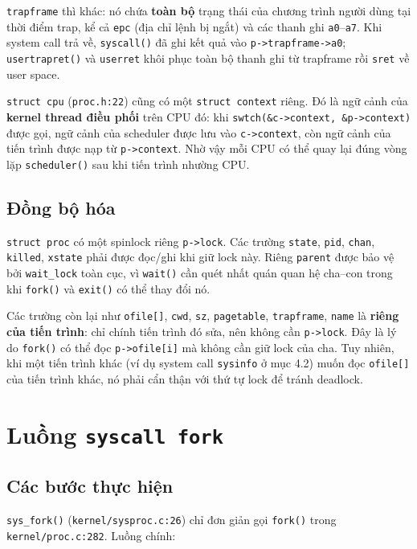 \texttt{trapframe} thì khác: nó chứa \textbf{toàn bộ} trạng thái của chương trình người dùng tại thời điểm trap, kể cả \texttt{epc} (địa chỉ lệnh bị ngắt) và các thanh ghi \texttt{a0}–\texttt{a7}. Khi system call trả về, \texttt{syscall()} đã ghi kết quả vào \texttt{p->trapframe->a0}; \texttt{usertrapret()} và \texttt{userret} khôi phục toàn bộ thanh ghi từ trapframe rồi \texttt{sret} về user space.

\texttt{struct cpu} (\texttt{proc.h:22}) cũng có một \texttt{struct context} riêng. Đó là ngữ cảnh của \textbf{kernel thread điều phối} trên CPU đó: khi \texttt{swtch(\&c->context, \&p->context)} được gọi, ngữ cảnh của scheduler được lưu vào \texttt{c->context}, còn ngữ cảnh của tiến trình được nạp từ \texttt{p->context}. Nhờ vậy mỗi CPU có thể quay lại đúng vòng lặp \texttt{scheduler()} sau khi tiến trình nhường CPU.

\subsection{Đồng bộ hóa}

\texttt{struct proc} có một spinlock riêng \texttt{p->lock}. Các trường \texttt{state}, \texttt{pid}, \texttt{chan}, \texttt{killed}, \texttt{xstate} phải được đọc/ghi khi giữ lock này. Riêng \texttt{parent} được bảo vệ bởi \texttt{wait\_lock} toàn cục, vì \texttt{wait()} cần quét nhất quán quan hệ cha–con trong khi \texttt{fork()} và \texttt{exit()} có thể thay đổi nó.

Các trường còn lại như \texttt{ofile[]}, \texttt{cwd}, \texttt{sz}, \texttt{pagetable}, \texttt{trapframe}, \texttt{name} là \textbf{riêng của tiến trình}: chỉ chính tiến trình đó sửa, nên không cần \texttt{p->lock}. Đây là lý do \texttt{fork()} có thể đọc \texttt{p->ofile[i]} mà không cần giữ lock của cha. Tuy nhiên, khi một tiến trình khác (ví dụ system call \texttt{sysinfo} ở mục 4.2) muốn đọc \texttt{ofile[]} của tiến trình khác, nó phải cẩn thận với thứ tự lock để tránh deadlock.

\section{Luồng \texttt{syscall fork}}

\subsection{Các bước thực hiện}

\texttt{sys\_fork()} (\texttt{kernel/sysproc.c:26}) chỉ đơn giản gọi \texttt{fork()} trong \texttt{kernel/proc.c:282}. Luồng chính:

